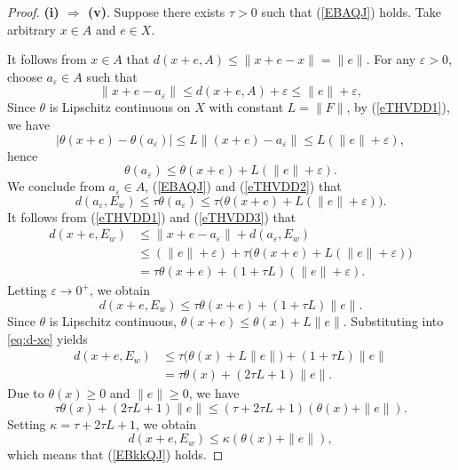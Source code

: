 \documentclass[11pt]{article}
\begin{document}
\begin{proof}
	\noindent\textbf{(i) $\Rightarrow$ (v)}.
Suppose there exists \(\tau > 0\)  such that   (\ref{EBAQJ}) holds. Take arbitrary \(x \in A\) and \(e \in X\).

It follows from  \(x \in A\)  that \(d(x+e, A) \le \|x+e - x\| = \|e\|\).
  For any \(\varepsilon > 0\), choose \(a_\varepsilon \in A\) such that
\begin{equation}\label{eTHVDD1}
\|x+e - a_\varepsilon\| \le d(x+e, A) + \varepsilon \le \|e\| + \varepsilon,
\end{equation}
Since  \(\theta\) is Lipschitz continuous on \(X\) with constant \(L = \|F\|\),  by (\ref{eTHVDD1}), we have 
\[
|\theta(x+e) - \theta(a_\varepsilon)| \le L \|(x+e) - a_\varepsilon\| \le L(\|e\| + \varepsilon),
\]
hence
\begin{equation}\label{eTHVDD2}
	\theta(a_\varepsilon) \le \theta(x+e) + L(\|e\| + \varepsilon).
\end{equation}
 We conclude from  \(a_\varepsilon \in A\),  (\ref{EBAQJ})  and  (\ref{eTHVDD2})  that
\begin{equation}\label{eTHVDD3}
	d(a_\varepsilon, E_w) \le \tau \theta(a_\varepsilon) \le \tau\bigl(\theta(x+e) + L(\|e\| + \varepsilon)\bigr).
\end{equation}
  It follows from  (\ref{eTHVDD1})  and  (\ref{eTHVDD3})    that
\[
\begin{aligned}
	d(x+e, E_w) &\le \|x+e - a_\varepsilon\| + d(a_\varepsilon, E_w) \\
	&\le (\|e\| + \varepsilon) + \tau\bigl(\theta(x+e) + L(\|e\| + \varepsilon)\bigr) \\
	&= \tau \theta(x+e) + (1 + \tau L)(\|e\| + \varepsilon).
\end{aligned}
\]
Letting \(\varepsilon \to 0^+\), we obtain
\begin{equation}\label{eq:d-xe}
	d(x+e, E_w) \le \tau \theta(x+e) + (1 + \tau L)\|e\|.
\end{equation}
Since  \(\theta\) is Lipschitz continuous, \(\theta(x+e) \le \theta(x) + L\|e\|\). Substituting into \eqref{eq:d-xe} yields
\[
\begin{aligned}
	d(x+e, E_w) &\le \tau\bigl(\theta(x) + L\|e\|\bigr) + (1 + \tau L)\|e\| \\
	&= \tau \theta(x) + (2\tau L + 1)\|e\|.
\end{aligned}
\]
 Due to  \(\theta(x) \ge 0\) and \(\|e\| \ge 0\), we have
\[
\tau \theta(x) + (2\tau L + 1)\|e\| \le (\tau + 2\tau L + 1)(\theta(x) + \|e\|).
\]
Setting \(\kappa = \tau + 2\tau L + 1\), we obtain
\[
d(x+e, E_w) \le \kappa (\theta(x) + \|e\|),
\]
  which means that  (\ref{EBkkQJ}) holds.


\end{proof}
\end{document}
